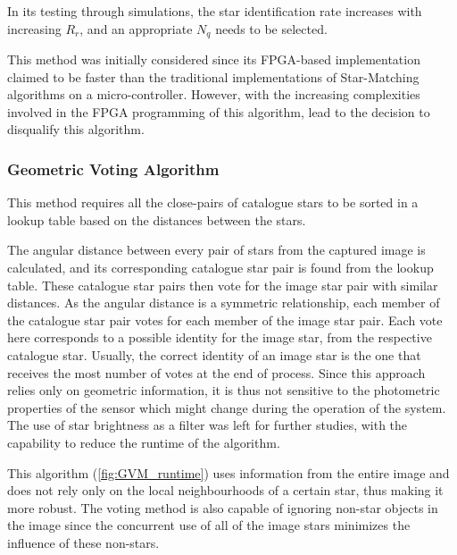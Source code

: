 \documentclass[../../main.tex]{subfiles}
\begin{document}
In its testing through simulations, the star identification rate increases with increasing $R_r$, and an appropriate $N_q$ needs to be selected.

This method was initially considered since its FPGA-based implementation \cite{zhao2017real} claimed to be faster than the traditional implementations of Star-Matching algorithms on a micro-controller. However, with the increasing complexities involved in the FPGA programming of this algorithm, lead to the decision to disqualify this algorithm.


\subsubsection{Geometric Voting Algorithm}
\label{sec:GVA}
This method \cite{kolomenkin2008geometric} requires all the close-pairs of catalogue stars to be sorted in a lookup table based on the distances between the stars.

The angular distance between every pair of stars from the captured image is calculated, and its corresponding catalogue star pair is found from the lookup table. These catalogue star pairs then vote for the image star pair with similar distances. As the angular distance is a symmetric relationship, each member of the catalogue star pair votes for each member of the image star pair. 
Each vote here corresponds to a possible identity for the image star, from the respective catalogue star. Usually, the correct identity of an image star is the one that receives the most number of votes at the end of process. Since this approach relies only on geometric information, it is thus not sensitive to the photometric properties of the sensor which might change during the operation of the system.
The use of star brightness as a filter was left for further studies, with the capability to reduce the runtime of the algorithm.

This algorithm (\ref{fig:GVM_runtime}) uses information from the entire image and does not rely only on the local neighbourhoods of a certain star, thus making it more robust. The voting method is also capable of ignoring non-star objects in the image since the concurrent use of all of the image stars minimizes the influence of these non-stars.
\end{document}
